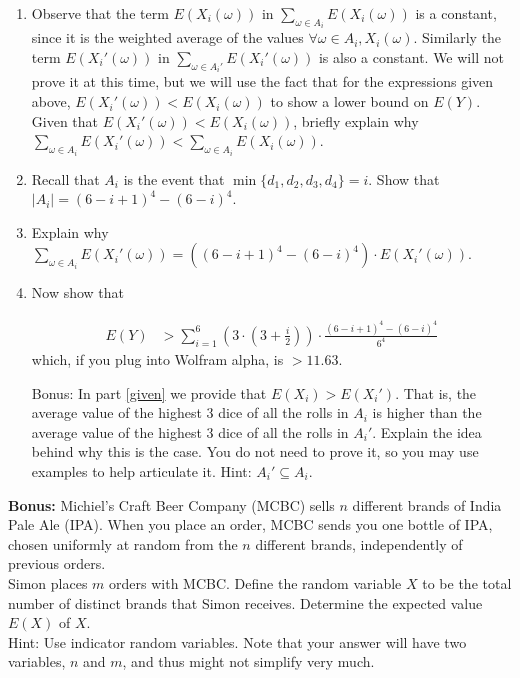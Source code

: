 \documentclass[12pt]{article}
\newcounter{ques}
\newenvironment{question}{\stepcounter{ques}{\noindent\bf Question \arabic{ques}:}}{\vspace{5mm}}
\begin{document}
\begin{question}
\begin{enumerate}
		
	
		
		\item\label{given} Observe that the term $E(X_i(\omega))$ in $\sum_{\omega \in A_i} E(X_i(\omega))$ is a constant, since it is the weighted average of the values $\forall \omega \in A_i, X_i(\omega)$. Similarly the term $E(X_i'(\omega))$ in $\sum_{\omega \in A_i'} E(X_i'(\omega))$ is also a constant. We will not prove it at this time, but we will use the fact that for the expressions given above, $E(X_i'(\omega))<E(X_i(\omega))$ to show a lower bound on $E(Y)$. Given that $E(X_i'(\omega))<E(X_i(\omega))$, briefly explain why $\sum_{\omega \in A_i} E(X_i'(\omega))<\sum_{\omega \in A_i} E(X_i(\omega))$. 
		
		
		\item Recall that $A_i$ is the event that $\min\{d_1,d_2,d_3,d_4\}=i$. Show that $|A_i|= (6-i+1)^4-(6-i)^4$. 
		
	
		
		\item Explain why $\sum_{\omega \in A_i} E(X_i'(\omega)) = \left((6-i+1)^4-(6-i)^4\right)\cdot E(X_i'(\omega))$.
		
		
		
		\item Now show that
		
		\begin{align*}
			E(Y) & > \sum_{i=1}^6  \left(3\cdot\left(3+\frac{i}{2}\right)\right)\cdot\frac{(6-i+1)^4-(6-i)^4}{6^4}
		\end{align*} 
		which, if you plug into Wolfram alpha, is $>11.63$. 
		
	
		
		\item[Bonus:] In part \ref{given} we provide that $E(X_i)>E(X_i')$. That is, the average value of the highest $3$ dice of all the rolls in $A_i$ is higher than the average value of the highest $3$ dice of all the rolls in $A_i'$. Explain the idea behind why this is the case. You do not need to prove it, so you may use examples to help articulate it. Hint: $A_i'\subseteq A_i$. 
		

	\end{enumerate}

\end{question}
\newpage
\begin{question}
	\textbf{Bonus:} Michiel’s Craft Beer Company (MCBC) sells $n$ different brands of India
	Pale Ale (IPA). When you place an order, MCBC sends you one bottle of
	IPA, chosen uniformly at random from the $n$ different brands, independently
	of previous orders.\\
	\indent Simon places $m$ orders with MCBC. Define the random variable $X$ to
	be the total number of distinct brands that Simon receives. Determine the
	expected value $E(X)$ of $X$.\\
\indent	Hint: Use indicator random variables. Note that your answer will have two variables, $n$ and $m$, and thus might not simplify very much. 
\end{question}
\end{document}
